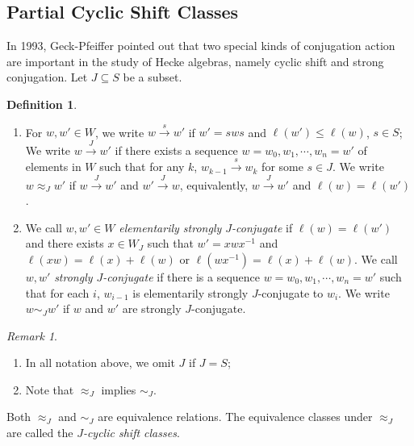 \documentclass[a4paper, reqno, 14pt]{amsart}
\def\subset{\subseteq}
\theoremstyle{definition}
\newtheorem{defn}[thm]{Definition}
\theoremstyle{remark}
\newtheorem*{rmk}{Remark}
\numberwithin{equation}{section}
\numberwithin{thm}{section}
\begin{document}
\subsection{Partial Cyclic Shift Classes}
    In 1993, Geck-Pfeiffer \cite{geck1993irreducible} pointed out that two special kinds of conjugation action are important in the study of Hecke algebras, namely cyclic shift and strong conjugation.
    Let $J\subset S$ be a subset.
    \begin{defn}
    
    \begin{enumerate}
        \item For $w, w' \in W$, we write $w \xrightarrow{s} w'$ if $w'=s w s$ and $\ell(w') \le \ell(w)$, $s \in S$; We write $w \xrightarrow{J} w'$ if there exists a sequence $w=w_0, w_1, \cdots, w_n=w'$ of elements in $W$ such that for any $k$, $w_{k-1} \xrightarrow{s} w_k$ for some $s \in J$.  We write $w \approx_{J} w'$ if $w \xrightarrow{J} w'$ and $w' \xrightarrow{J} w$, equivalently, $w \xrightarrow{J} w'$ and $\ell(w)=\ell(w')$.
        
        
        \item We call $w, w' \in W$ \emph{elementarily strongly $J$-conjugate} if $\ell(w)=\ell(w')$ and there exists $x \in W_J$ such that $w'=x w x^{-1}$ and $\ell(x w)=\ell(x)+\ell(w)$ or $\ell(w x^{-1})=\ell(x)+\ell(w)$. We call $w, w'$ {\it strongly $J$-conjugate} if there is a sequence $w=w_0, w_1, \cdots, w_n=w'$ such that for each $i$, $w_{i-1}$ is elementarily strongly $J$-conjugate to $w_i$. We write $w \sim_{J} w'$ if $w$ and $w'$ are strongly $J$-conjugate.

    \end{enumerate}  
    \end{defn}
    \begin{rmk}
    \begin{enumerate}
        \item In all notation above, we omit $J$ if $J=S$;
        \item Note that $\approx_J$ implies $\sim_J$.
    \end{enumerate}
        Both $\approx_{J}$ and $\sim_{J}$ are equivalence relations. The equivalence classes under $\approx_{J}$ are called the \emph{$J$-cyclic shift classes}. 
        
    \end{rmk}

    
\end{document}
